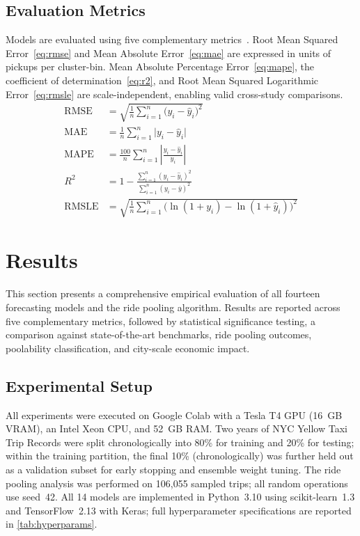 \documentclass[a4paper,fleqn]{cas-dc}
\begin{document}
\subsection{Evaluation Metrics}
\label{sec:metrics}

Models are evaluated using five complementary metrics~\cite{scikit-learn}.  Root Mean Squared Error~\eqref{eq:rmse} and Mean Absolute Error~\eqref{eq:mae} are expressed in units of pickups per cluster-bin.  Mean Absolute Percentage Error~\eqref{eq:mape}, the coefficient of determination~\eqref{eq:r2}, and Root Mean Squared Logarithmic Error~\eqref{eq:rmsle} are scale-independent, enabling valid cross-study comparisons.
\begin{align}
  \text{RMSE} &= \sqrt{\frac{1}{n}\sum_{i=1}^n \bigl(y_i - \hat{y}_i\bigr)^2} \label{eq:rmse} \\
  \text{MAE}  &= \frac{1}{n}\sum_{i=1}^n \bigl|y_i - \hat{y}_i\bigr| \label{eq:mae} \\
  \text{MAPE} &= \frac{100}{n}\sum_{i=1}^n \left|\frac{y_i - \hat{y}_i}{y_i}\right| \label{eq:mape} \\
  R^2         &= 1 - \frac{\displaystyle\sum_{i=1}^n(y_i-\hat{y}_i)^2}{\displaystyle\sum_{i=1}^n(y_i - \bar{y})^2} \label{eq:r2} \\
  \text{RMSLE}&= \sqrt{\frac{1}{n}\sum_{i=1}^n \bigl(\ln(1+y_i)-\ln(1+\hat{y}_i)\bigr)^2} \label{eq:rmsle}
\end{align}

\section{Results}
\label{sec:eval}

This section presents a comprehensive empirical evaluation of all fourteen forecasting models and the ride pooling algorithm.  Results are reported across five complementary metrics, followed by statistical significance testing, a comparison against state-of-the-art benchmarks, ride pooling outcomes, poolability classification, and city-scale economic impact.

\subsection{Experimental Setup}

All experiments were executed on Google Colab with a Tesla T4 GPU (16~GB VRAM), an Intel Xeon CPU, and 52~GB RAM.  Two years of NYC Yellow Taxi Trip Records were split chronologically into 80\% for training and 20\% for testing; within the training partition, the final 10\% (chronologically) was further held out as a validation subset for early stopping and ensemble weight tuning.  The ride pooling analysis was performed on 106,055 sampled trips; all random operations use seed~42.  All 14 models are implemented in Python~3.10 using scikit-learn~1.3 and TensorFlow~2.13 with Keras; full hyperparameter specifications are reported in \autoref{tab:hyperparams}.
\end{document}
